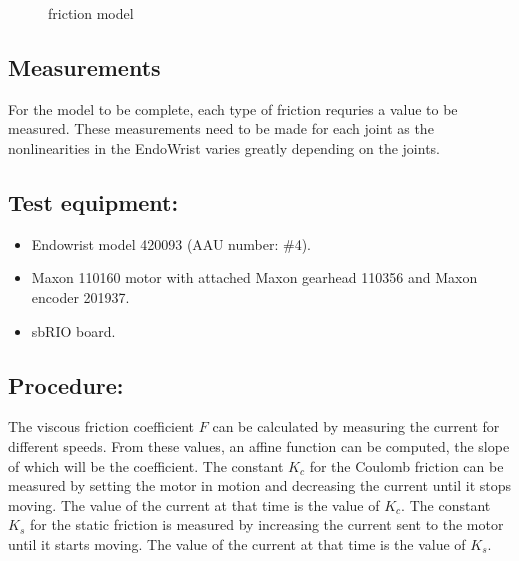 \begin{figure}[h]
\centering
\caption{friction model}
\end{figure}

\subsection{Measurements}

For the model to be complete, each type of friction requries a value to be measured. These measurements need to be made for each joint as the nonlinearities in the EndoWrist varies greatly depending on the joints.

\subsection*{Test equipment:}

\begin{itemize}
	\item Endowrist model 420093 (AAU number: \#4).
	\item Maxon 110160 motor with attached Maxon gearhead 110356 and Maxon encoder 201937.
	\item sbRIO board.
\end{itemize}

\subsection*{Procedure:}
The viscous friction coefficient $F$ can be calculated by measuring the current for different speeds. From these values, an affine function can be computed, the slope of which will be the coefficient.
The constant $K_c$ for the Coulomb friction can be measured by setting the motor in motion and decreasing the current until it stops moving. The value of the current at that time is the value of $K_c$.
The constant $K_s$ for the static friction is measured by increasing the current sent to the motor until it starts moving. The value of the current at that time is the value of $K_s$.

